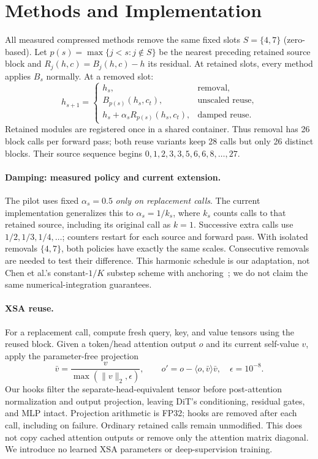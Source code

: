 \documentclass[sigconf,nonacm]{acmart}
\begin{document}
\section{Methods and Implementation}
All measured compressed methods remove the same fixed slots
$S=\{4,7\}$ (zero-based). Let $p(s)=\max\{j<s:j\notin S\}$ be the nearest
preceding retained source block and $R_j(h,c)=B_j(h,c)-h$ its residual.
At retained slots, every method applies $B_s$ normally. At a removed slot:
\begin{equation}
 h_{s+1}=\begin{cases}
 h_s,&\text{removal},\\
 B_{p(s)}(h_s,c_t),&\text{unscaled reuse},\\
 h_s+\alpha_s R_{p(s)}(h_s,c_t),&\text{damped reuse}.
 \end{cases}
 \label{eq:methods}
\end{equation}
Retained modules are registered once in a shared container. Thus removal has
26 block calls per forward pass; both reuse variants keep 28 calls but only
26 distinct blocks. Their source sequence begins
$0,1,2,3,3,5,6,6,8,\ldots,27$.

\paragraph{Damping: measured policy and current extension.}
The pilot uses fixed $\alpha_s=0.5$ \emph{only on replacement calls}. The
current implementation generalizes this to $\alpha_s=1/k_s$, where $k_s$
counts calls to that retained source, including its original call as $k=1$.
Successive extra calls use $1/2,1/3,1/4,\ldots$; counters restart for each
source and forward pass. With isolated removals $\{4,7\}$, both policies
have exactly the same scales. Consecutive removals are needed to test their
difference. This harmonic schedule is our adaptation, not Chen et al.'s
constant-$1/K$ substep scheme with anchoring~\cite{chen2026trainingfree}; we
do not claim the same numerical-integration guarantees.

\paragraph{XSA reuse.}
For a replacement call, compute fresh query, key, and value tensors using
the reused block. Given a token/head attention output $o$ and its current
self-value $v$, apply the parameter-free projection~\cite{chng2026loopeddit}
\begin{equation}
 \bar v=\frac{v}{\max(\|v\|_2,\epsilon)},\qquad
 o'=o-\langle o,\bar v\rangle\bar v,\quad\epsilon=10^{-8}.
 \label{eq:xsa}
\end{equation}
Our hooks filter the separate-head-equivalent tensor before post-attention
normalization and output projection, leaving DiT's conditioning, residual
gates, and MLP intact. Projection arithmetic is FP32; hooks are removed after
each call, including on failure. Ordinary retained calls remain unmodified.
This does not copy cached attention outputs or remove only the attention
matrix diagonal. We introduce no learned XSA parameters or deep-supervision
training.
\end{document}

